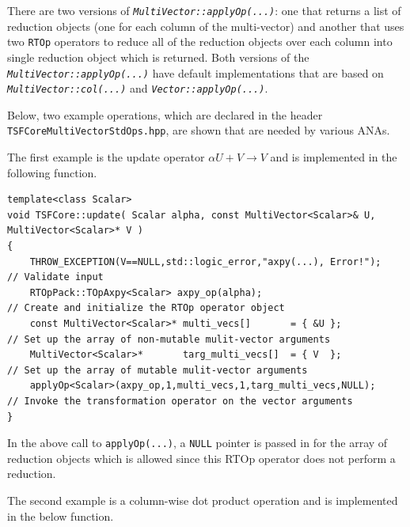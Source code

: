 There are two versions of
\texttt{\textit{Multi\-Vector\-::applyOp(\-...)}}: one that returns a list
of reduction objects (one for each column of the multi-vector) and
another that uses two \texttt{RTOp} operators to reduce all of the
reduction objects over each column into single reduction object which
is returned.  Both versions of the
\texttt{\textit{Multi\-Vector\-::applyOp(\-...)}} have default implementations
that are based on \texttt{\textit{Multi\-Vector\-::col(...)}} and
\texttt{\textit{Vector\-::applyOp(\-...)}}.

Below, two example operations, which are declared in the header
\texttt{TSFCore\-Multi\-Vector\-Std\-Ops.hpp}, are shown that are needed
by various ANAs.

The first example is the update operator $\alpha U + V \rightarrow V$
and is implemented in the following function.

{\tiny\begin{verbatim}
template<class Scalar>
void TSFCore::update( Scalar alpha, const MultiVector<Scalar>& U, MultiVector<Scalar>* V )
{
    THROW_EXCEPTION(V==NULL,std::logic_error,"axpy(...), Error!");    // Validate input
    RTOpPack::TOpAxpy<Scalar> axpy_op(alpha);                         // Create and initialize the RTOp operator object
    const MultiVector<Scalar>* multi_vecs[]       = { &U };           // Set up the array of non-mutable mulit-vector arguments
    MultiVector<Scalar>*       targ_multi_vecs[]  = { V  };           // Set up the array of mutable mulit-vector arguments
    applyOp<Scalar>(axpy_op,1,multi_vecs,1,targ_multi_vecs,NULL);     // Invoke the transformation operator on the vector arguments
}
\end{verbatim}}

In the above call to \texttt{applyOp(\-...)}, a \texttt{NULL} pointer is
passed in for the array of reduction objects which is allowed since
this RTOp operator does not perform a reduction.

The second example is a column-wise dot product operation and is
implemented in the below function.

